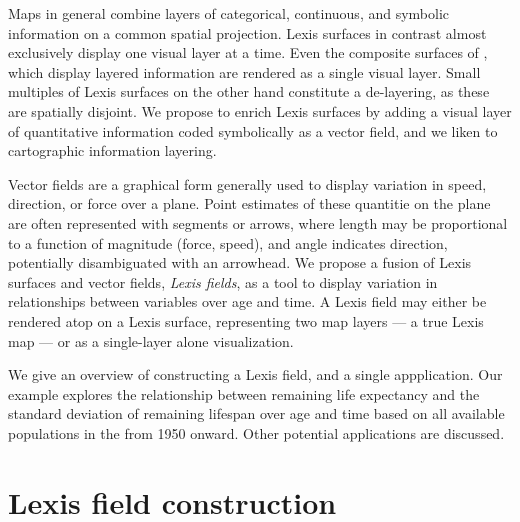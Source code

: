 \documentclass{article}
\begin{document}
Maps in general combine layers of categorical, continuous, and
symbolic information on a common spatial projection. Lexis surfaces in contrast almost exclusively display one visual layer at a time. Even the composite surfaces of \citet{scholey2017visualizing}, which display layered information are rendered as a single visual layer. Small multiples of Lexis surfaces on the other hand constitute a de-layering, as these are spatially disjoint. We propose to enrich Lexis surfaces by adding a visual layer of quantitative information coded symbolically as a vector field, and we liken to cartographic information layering.

Vector fields are a graphical form generally used to display variation in speed,
direction, or force over a plane. Point estimates of these quantitie on the plane are
often represented with segments or arrows, where length may be proportional to a function of
magnitude (force, speed), and angle indicates direction, potentially disambiguated with an arrowhead. We propose a fusion of Lexis surfaces and vector fields, \emph{Lexis fields}, as a tool to
display variation in relationships between variables over age and time. A Lexis field may either be rendered atop on a Lexis surface, representing two map layers --- a true Lexis map --- or as a single-layer alone visualization. 

We give an overview of constructing a Lexis field, and a single appplication. Our example explores the relationship between remaining life expectancy and
the standard deviation of remaining lifespan over age and time based on all
available populations in the \citet{HMD} from 1950 onward. Other potential applications are discussed.

\section{Lexis field construction}
\end{document}
